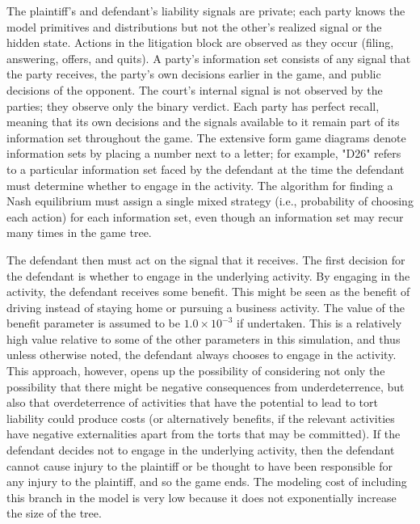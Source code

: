 \documentclass{article}
\begin{document}
The plaintiff’s and defendant’s liability signals are private; each party knows the model primitives and distributions but not the other’s realized signal or the hidden state. Actions in the litigation block are observed as they occur (filing, answering, offers, and quits). A party's information set consists of any signal that the party receives, the party's own decisions earlier in the game, and public decisions of the opponent. The court’s internal signal is not observed by the parties; they observe only the binary verdict. Each party has perfect recall, meaning that its own decisions and the signals available to it remain part of its information set throughout the game. The extensive form game diagrams denote information sets by placing a number next to a letter; for example, "D26" refers to a particular information set faced by the defendant at the time the defendant must determine whether to engage in the activity. The algorithm for finding a Nash equilibrium must assign a single mixed strategy (i.e., probability of choosing each action) for each information set, even though an information set may recur many times in the game tree.

The defendant then must act on the signal that it receives. The first decision for the defendant is whether to engage in the underlying activity. By engaging in the activity, the defendant receives some benefit. This might be seen as the benefit of driving instead of staying home or pursuing a business activity. The value of the benefit parameter is assumed to be $1.0 \times 10^{-3}$ if undertaken. This is a relatively high value relative to some of the other parameters in this simulation, and thus unless otherwise noted, the defendant always chooses to engage in the activity. This approach, however, opens up the possibility of considering not only the possibility that there might be negative consequences from underdeterrence, but also that overdeterrence of activities that have the potential to lead to tort liability could produce costs (or alternatively benefits, if the relevant activities have negative externalities apart from the torts that may be committed). If the defendant decides not to engage in the underlying activity, then the defendant cannot cause injury to the plaintiff or be thought to have been responsible for any injury to the plaintiff, and so the game ends. The modeling cost of including this branch in the model is very low because it does not exponentially increase the size of the tree.
\end{document}

